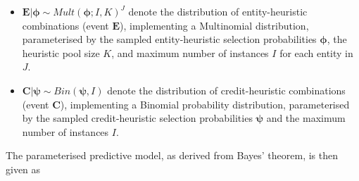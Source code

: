 \begin{itemize}
      \item $\boldsymbol{E} \vert \boldsymbol{\phi} \sim Mult(\boldsymbol{\phi}; I, K)^{J}$ denote the distribution of entity-heuristic combinations (event $\boldsymbol{E}$), implementing a Multinomial distribution, parameterised by the sampled entity-heuristic selection probabilities $\boldsymbol{\phi}$, the heuristic pool size $K$, and maximum number of instances $I$ for each entity in $J$.

      \item $\boldsymbol{C} \vert \boldsymbol{\psi} \sim Bin(\boldsymbol{\psi}, I)$ denote the distribution of credit-heuristic combinations (event $\boldsymbol{C}$), implementing a Binomial probability distribution, parameterised by the sampled credit-heuristic selection probabilities $\boldsymbol{\psi}$ and the maximum number of instances $I$.
\end{itemize}

The parameterised predictive model, as derived from Bayes' theorem, is then given as

